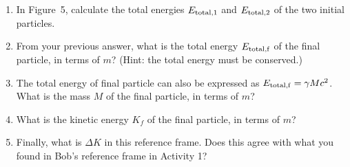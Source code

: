 \begin{enumerate}[labparts]
\item In Figure~5, calculate the total energies $E_{\rm total,1}$ and $E_{\rm total,2}$ of the two initial particles.
\answerspace{0.6in}

\item From your previous answer, what is the total energy $E_{\rm total,f}$ of the final particle, in terms of $m$?  (Hint: the total energy must be conserved.)
\answerspace{0.4in}

\item The total energy of final particle can also be expressed as $E_{\rm total,f} = \gamma Mc^2$.  What is the mass $M$ of the final particle, in terms of $m$?
\answerspace{0.6in}

\item What is the kinetic energy $K_f$ of the final particle, in terms of $m$?
\answerspace{0.6in}

\item Finally, what is $\Delta K$ in this reference frame.  Does this agree with what you found in Bob's reference frame in Activity 1?
\answerspace{0.6in}
\end{enumerate}







